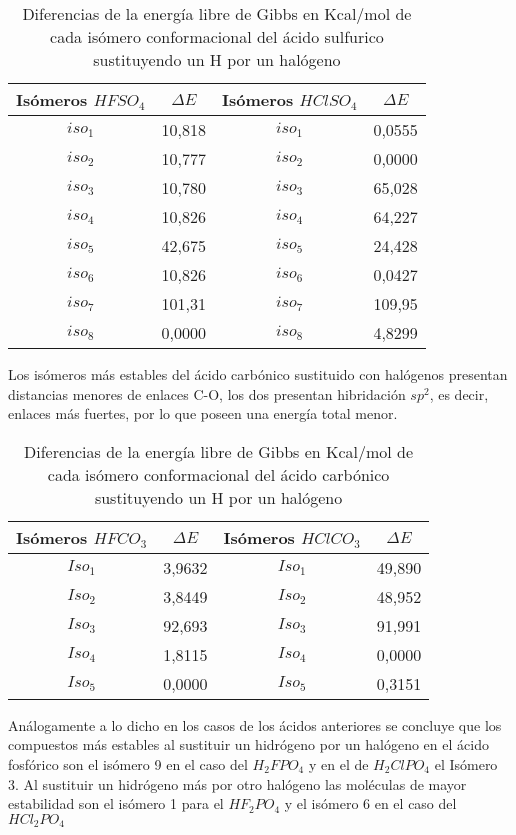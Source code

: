 \begin{table}[H]
	\begin{center}
		\begin{tabular}{|c|c|c|c|}
			\hline
			Isómeros $HFSO_4$ & $\Delta E$ & Isómeros $HClSO_4$ & $\Delta E$ \\ \hline
			$iso_1$	& 10,818 & $iso_1$ & 0,0555 \\ \hline
			$iso_2$ & 10,777 & $iso_2$ & 0,0000 \\ \hline
			$iso_3$ & 10,780 & $iso_3$ & 65,028 \\ \hline
			$iso_4$ & 10,826 & $iso_4$ & 64,227 \\ \hline
			$iso_5$ & 42,675 & $iso_5$ & 24,428 \\ \hline
			$iso_6$ & 10,826 & $iso_6$ & 0,0427 \\ \hline
			$iso_7$ &	101,31 & $iso_7$ & 109,95 \\ \hline
			$iso_8$ &	0,0000 & $iso_8$ & 4,8299 \\ \hline
		\end{tabular}
		\caption{Diferencias de la energía libre de Gibbs en Kcal/mol de cada isómero conformacional del ácido sulfurico sustituyendo un H por un halógeno}
	\end{center}
\end{table}

Los isómeros más estables del ácido carbónico sustituido con halógenos presentan distancias menores de enlaces C-O, los dos presentan hibridación $sp^2$, es decir, enlaces más fuertes, por lo que poseen una energía total menor. 

\begin{table}[H]
	\begin{center}
		\begin{tabular}{|c|c|c|c|}
			\hline 
			Isómeros $HFCO_3$ & $\Delta E$ & Isómeros $HClCO_3$& $\Delta E$ \\ \hline
			$Iso_1$ & 3,9632 & $Iso_1$ & 49,890 \\ \hline
			$Iso_2$ & 3,8449 & $Iso_2$ & 48,952 \\ \hline
			$Iso_3$ & 92,693 & $Iso_3$ & 91,991 \\ \hline
			$Iso_4$ & 1,8115 & $Iso_4$ & 0,0000 \\ \hline
			$Iso_5$ & 0,0000 & $Iso_5$ & 0,3151 \\ \hline
		\end{tabular}
		\caption{Diferencias de la energía libre de Gibbs en Kcal/mol de cada isómero conformacional del ácido carbónico sustituyendo un H por un halógeno}
	\end{center}
\end{table}
\newpage
Análogamente a lo dicho en los casos de los ácidos anteriores se concluye que los compuestos más estables al sustituir un hidrógeno por un halógeno en el ácido fosfórico son el isómero 9 en el caso del $H_2FPO_4$ y en el de $H_2ClPO_4$ el Isómero 3. Al sustituir un hidrógeno más por otro halógeno las moléculas de mayor estabilidad son el isómero 1 para el  $HF_2PO_4$ y el isómero 6 en el caso del  $HCl_2PO_4$ 

